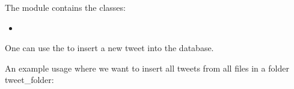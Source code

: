 \documentclass[letterpaper,10pt,english]{sphinxmanual}
\begin{document}
The {\hyperref[\detokenize{mongoDB_data_ingestion:module-ingest_raw}]{}} module contains the classes:
\begin{itemize}
\item {} 
{\hyperref[\detokenize{mongoDB_data_ingestion:ingest_raw.Ingest}]{}}

\end{itemize}

One can use the {\hyperref[\detokenize{mongoDB_data_ingestion:ingest_raw.Ingest.insert_tweet}]{}} to insert a new tweet into the database.

An example usage where we want to insert all tweets from all files in a folder tweet\_folder:

\begin{sphinxVerbatim}[commandchars=\\\{\}]
  
 
\end{sphinxVerbatim}
\end{document}
